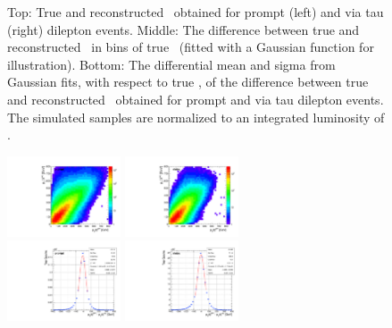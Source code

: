 \begin{figure}
\begin{center}
    \caption{\small Top: True and reconstructed \ytt\ obtained for prompt (left) and via tau (right) \ttbar dilepton events.
    Middle: The difference between true and reconstructed \ytt\ in bins of true \ytt\ (fitted with a Gaussian function for illustration).
    Bottom: The differential mean and sigma from Gaussian fits, with respect to true \ytt, of the difference between true and reconstructed \ytt\ obtained for prompt and via tau \ttbar dilepton events.
    The simulated samples are normalized to an integrated luminosity of \lumivalueRuniiUL.}
    \label{fig:kinrec:resolution-ytt}
 \end{center}
\end{figure}

\begin{figure}
  \begin{center}
    \includegraphics[width=0.30\textwidth]{fig_fullRun2UL/KinRecoResolutions/top_pT_genreco_prompt.pdf}
    \includegraphics[width=0.30\textwidth]{fig_fullRun2UL/KinRecoResolutions/top_pT_genreco_viatau.pdf}\\
    \includegraphics[width=0.30\textwidth]{fig_fullRun2UL/KinRecoResolutions/top_pT_residual_prompt.pdf}
    \includegraphics[width=0.30\textwidth]{fig_fullRun2UL/KinRecoResolutions/top_pT_residual_viatau.pdf}\\

\end{center}
\end{figure}
